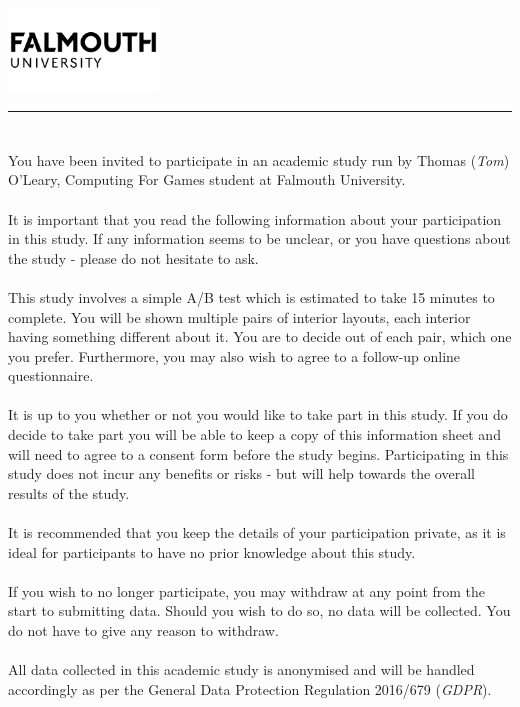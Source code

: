 \documentclass{article}
\begin{document}
\includegraphics[width=0.3\textwidth]{falmouth-university-vector-logo.png}
\vspace{-1em}

\rule{\linewidth}{1pt}
\bigskip

\section*{}
You have been invited to participate in an academic study run by Thomas (\textit{Tom}) O’Leary, Computing For Games student at Falmouth University.
\\
\\
It is important that you read the following information about your participation in this study.
If any information seems to be unclear, or you have questions about the study - please do not hesitate to ask.
\\
\\
This study involves a simple A/B test which is estimated to take 15 minutes to complete. 
You will be shown multiple pairs of interior layouts, each interior having something different 
about it. 
You are to decide out of each pair, which one you prefer. 
Furthermore, you may also wish to agree to a follow-up online questionnaire.
\\
\\
It is up to you whether or not you would like to take part in this study. 
If you do decide to take part you will be able to keep a copy of this information sheet 
and will need to agree to a consent form before the study begins.
Participating in this study does not incur any benefits or risks - but will help towards 
the overall results of the study.
\\
\\
It is recommended that you keep the details of your participation private, as it is ideal for participants to have no prior knowledge about this study.
\\
\\
If you wish to no longer participate, you may withdraw at any point from the start to submitting data.
Should you wish to do so, no data will be collected.
You do not have to give any reason to withdraw.
\\
\\
All data collected in this academic study is anonymised and will be handled accordingly as per the General Data Protection Regulation 2016/679 (\textit{GDPR}).
\bigskip
\end{document}
